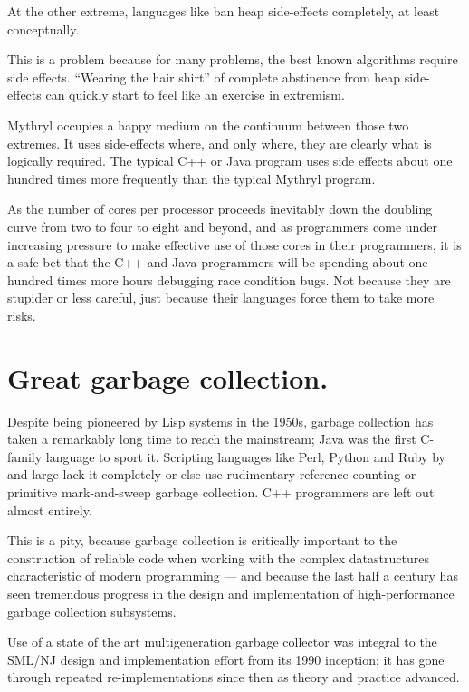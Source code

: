 At the other extreme, languages like 
  
ban heap side-effects completely, at least conceptually.

This is a problem because for many problems, the best known algorithms 
require side effects.  ``Wearing the hair shirt'' of complete abstinence 
from heap side-effects can quickly start to feel like an exercise in 
extremism.

Mythryl occupies a happy medium on the continuum between those two extremes. 
It uses side-effects where, and only where, they are clearly what is logically 
required.  The typical C++ or Java program uses side effects about one hundred 
times more frequently than the typical Mythryl program.

As the number of cores 
per processor proceeds inevitably down the doubling curve from two to four to 
eight and beyond, and as programmers come under increasing pressure to make 
effective use of those cores in their programmers, it is a safe bet that the 
C++ and Java programmers will be spending about one hundred times more hours 
debugging race condition bugs.  Not because they are stupider or less careful, 
just because their languages force them to take more risks.

\section{Great garbage collection.}

Despite being pioneered by Lisp systems in the 1950s, garbage collection has 
taken a remarkably long time to reach the mainstream;  Java was the first C-family 
language to sport it.  Scripting languages like Perl, Python and Ruby by and large 
lack it completely or else use rudimentary reference-counting or primitive 
mark-and-sweep garbage collection.  C++ programmers are left out almost entirely.

This is a pity, because garbage collection is critically important to the 
construction of reliable code when working with the complex datastructures 
characteristic of modern programming --- and because the last half a century 
has seen tremendous progress in the design and implementation of high-performance 
garbage collection subsystems.

Use of a state of the art multigeneration garbage collector was integral 
to the {\sc SML/NJ} design and implementation effort from its 1990 inception; 
it has gone through repeated re-implementations since then as theory and 
practice advanced.

